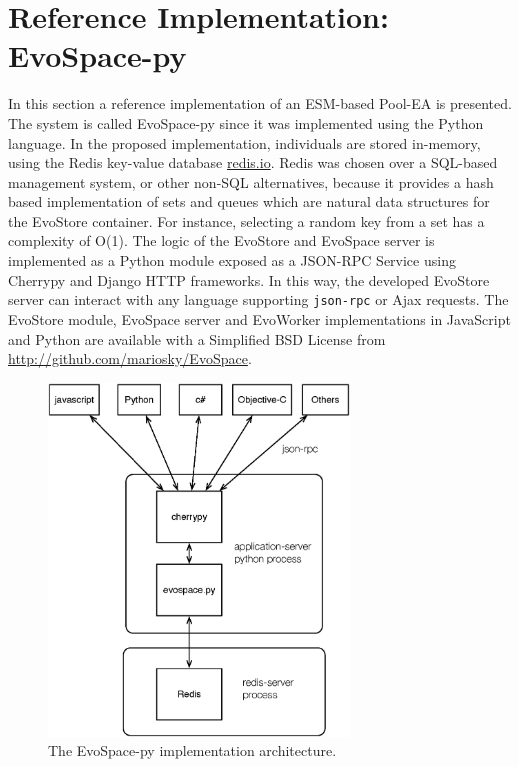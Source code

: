 \section{Reference Implementation: EvoSpace-py}
\label{sec:ref}
In this section a reference implementation of an ESM-based Pool-EA is presented.
The system is called EvoSpace-py since it was implemented using the Python language. 
In the proposed implementation, individuals are stored in-memory, using the Redis key-value database \url{redis.io}. 
Redis was chosen over a SQL-based management system, or other non-SQL
alternatives, because it provides a hash based implementation of sets
and queues which are natural data structures for the EvoStore container.
For instance, selecting a random key from a set has a complexity
of O(1). The logic of the EvoStore and EvoSpace server is implemented as a Python module exposed as a JSON-RPC Service using Cherrypy and Django HTTP frameworks.
In this way, the developed EvoStore server %
can interact with any language supporting {\tt json-rpc} or Ajax requests. The EvoStore module, EvoSpace server and EvoWorker implementations in JavaScript and Python are available with a Simplified BSD License from \url{http://github.com/mariosky/EvoSpace}.

\begin{figure}[t]
    \centering
        \includegraphics[width=8cm]{evospace.eps}
    \caption{The EvoSpace-py implementation architecture.} %
    \label{fig:evospace}
\end{figure}

